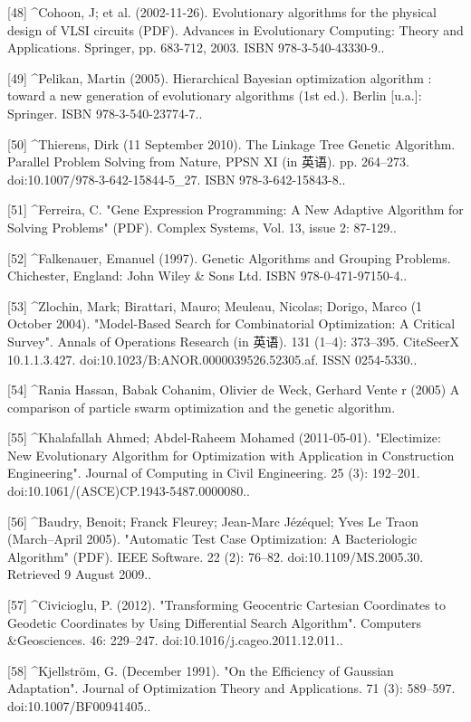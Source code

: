 [48]
^Cohoon, J; et al. (2002-11-26). Evolutionary algorithms for the physical design of VLSI circuits (PDF). Advances in Evolutionary Computing: Theory and Applications. Springer, pp. 683-712, 2003. ISBN 978-3-540-43330-9..

[49]
^Pelikan, Martin (2005). Hierarchical Bayesian optimization algorithm : toward a new generation of evolutionary algorithms (1st ed.). Berlin [u.a.]: Springer. ISBN 978-3-540-23774-7..

[50]
^Thierens, Dirk (11 September 2010). The Linkage Tree Genetic Algorithm. Parallel Problem Solving from Nature, PPSN XI (in 英语). pp. 264–273. doi:10.1007/978-3-642-15844-5_27. ISBN 978-3-642-15843-8..

[51]
^Ferreira, C. "Gene Expression Programming: A New Adaptive Algorithm for Solving Problems" (PDF). Complex Systems, Vol. 13, issue 2: 87-129..

[52]
^Falkenauer, Emanuel (1997). Genetic Algorithms and Grouping Problems. Chichester, England: John Wiley & Sons Ltd. ISBN 978-0-471-97150-4..

[53]
^Zlochin, Mark; Birattari, Mauro; Meuleau, Nicolas; Dorigo, Marco (1 October 2004). "Model-Based Search for Combinatorial Optimization: A Critical Survey". Annals of Operations Research (in 英语). 131 (1–4): 373–395. CiteSeerX 10.1.1.3.427. doi:10.1023/B:ANOR.0000039526.52305.af. ISSN 0254-5330..

[54]
^Rania Hassan, Babak Cohanim, Olivier de Weck, Gerhard Vente r (2005) A comparison of particle swarm optimization and the genetic algorithm.

[55]
^Khalafallah Ahmed; Abdel-Raheem Mohamed (2011-05-01). "Electimize: New Evolutionary Algorithm for Optimization with Application in Construction Engineering". Journal of Computing in Civil Engineering. 25 (3): 192–201. doi:10.1061/(ASCE)CP.1943-5487.0000080..

[56]
^Baudry, Benoit; Franck Fleurey; Jean-Marc Jézéquel; Yves Le Traon (March–April 2005). "Automatic Test Case Optimization: A Bacteriologic Algorithm" (PDF). IEEE Software. 22 (2): 76–82. doi:10.1109/MS.2005.30. Retrieved 9 August 2009..

[57]
^Civicioglu, P. (2012). "Transforming Geocentric Cartesian Coordinates to Geodetic Coordinates by Using Differential Search Algorithm". Computers &Geosciences. 46: 229–247. doi:10.1016/j.cageo.2011.12.011..

[58]
^Kjellström, G. (December 1991). "On the Efficiency of Gaussian Adaptation". Journal of Optimization Theory and Applications. 71 (3): 589–597. doi:10.1007/BF00941405..